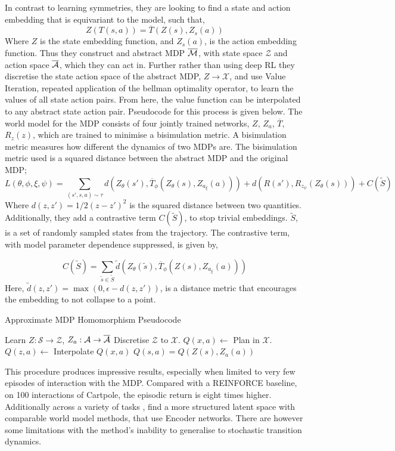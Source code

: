 In contrast to learning symmetries, they are looking to find a state and action embedding that is equivariant to the model, such that,
\begin{equation}
	Z(T(s, a)) = \overline{T}(Z(s), Z_s(a))
\end{equation}
Where $Z$ is the state embedding function, and $Z_s(a)$, is the action embedding function. Thus they construct and abstract MDP $\overline{\mathcal{M}}$, with state space $\mathcal{Z}$ and action space $\overline{\mathcal{A}}$, which they can act in. Further rather than using deep RL they discretise the state action space of the abstract MDP, $Z \rightarrow \mathcal{X}$, and use Value Iteration, repeated application of the bellman optimality operator, to learn the values of all state action pairs. From here, the value function can be interpolated to any abstract state action pair. Pseudocode for this process is given below. The world model for the MDP consists of four jointly trained networks, $Z$, $Z_a$, $\overline{T}$,$R_z(z)$, which are trained to minimise a bisimulation metric. A bisimulation metric measures how different the dynamics of two MDPs are. The bisimulation metric used is a squared distance between the abstract MDP and the original MDP;
\begin{equation}
	L(\theta, \phi, \xi, \psi) = \sum_{(s', s, a) \sim \tau} d(Z_\theta (s'), \overline{T}_\phi(Z_\theta(s), Z_{a_\xi}(a))) +  d(R(s'), R_{z_\psi}(Z_\theta (s))) + C(\tilde{S})
\end{equation}
Where $d(z, z') = 1/2 (z - z')^2$ is the squared distance between two quantities. Additionally, they add a contrastive term $C(\tilde{S})$, to stop trivial embeddings. $\tilde{S}$, is a set of randomly sampled states from the trajectory. The contrastive term, with model parameter dependence suppressed, is given by,

\begin{equation}
	C(\tilde{S}) = \sum_{\tilde{s} \in \tilde{S}} \tilde{d}(Z_\theta(\tilde{s}), \overline{T}_\phi(Z(s), Z_{a_\xi}(a)))
\end{equation}
Here, $\tilde{d}(z, z') = \max(0, \epsilon - d(z, z'))$, is a distance metric that encourages the embedding to not collapse to a point.
\begin{algorithm}
	\caption{Approximate MDP Homomorphism Pseudocode}
	\begin{algorithmic}
		\State Learn $Z: \mathcal{S} \rightarrow \mathcal{Z}$, $Z_a: \mathcal{A} \rightarrow \overline{\mathcal{A}}$
		\State Discretise $\mathcal{Z}$ to $\mathcal{X}$.
		\State $Q(x, a) \leftarrow $ Plan in $\mathcal{X}$.
		\State $Q(z, a) \leftarrow$ Interpolate $Q(x, a)$
		\State $Q(s, a) = Q(Z(s), Z_a(a))$
	\end{algorithmic}
\end{algorithm}
This procedure produces impressive results, especially when limited to very few episodes of interaction with the MDP. Compared with a REINFORCE baseline, on 100 interactions of Cartpole, the episodic return is eight times higher. Additionally across a variety of tasks \cite{van2020plannable}, find a more structured latent space with comparable world model methods, that use Encoder networks. There are however some limitations with the method's inability to generalise to stochastic transition dynamics.


